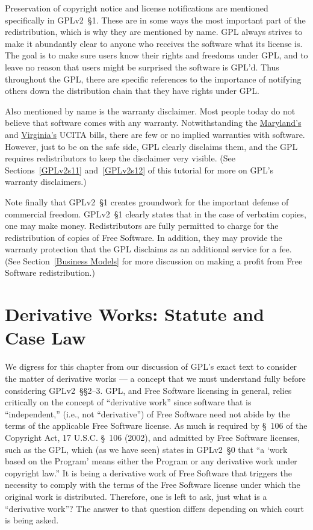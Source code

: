 Preservation of copyright notice and license notifications are mentioned
specifically in GPLv2~\S1.  These are in some ways the most important part of
the redistribution, which is why they are mentioned by name.  GPL
always strives to make it abundantly clear to anyone who receives the
software what its license is.  The goal is to make sure users know their
rights and freedoms under GPL, and to leave no reason that users might be
surprised the software is GPL'd. Thus
throughout the GPL, there are specific references to the importance of
notifying others down the distribution chain that they have rights under
GPL.

Also mentioned by name is the warranty disclaimer. Most people today do
not believe that software comes with any warranty.  Notwithstanding the
\href{http://mlis.state.md.us/2000rs/billfile/hb0019.htm}{Maryland's} and \href{http://leg1.state.va.us/cgi-bin/legp504.exe?001+ful+SB372ER}{Virginia's} UCITA bills, there are few or no implied warranties with software.
However, just to be on the safe side, GPL clearly disclaims them, and the
GPL requires redistributors to keep the disclaimer very visible. (See
Sections~\ref{GPLv2s11} and~\ref{GPLv2s12} of this tutorial for more on GPL's
warranty disclaimers.)

Note finally that GPLv2~\S1 creates groundwork for the important defense of
commercial freedom.  GPLv2~\S1 clearly states that in the case of verbatim
copies, one may make money.  Redistributors are fully permitted to charge
for the redistribution of copies of Free Software. In addition, they may
provide the warranty protection that the GPL disclaims as an additional
service for a fee. (See Section~\ref{Business Models} for more discussion
on making a profit from Free Software redistribution.)


\chapter{Derivative Works: Statute and Case Law}

We digress for this chapter from our discussion of GPL's exact text to
consider the matter of derivative works --- a concept that we must
understand fully before considering GPLv2~\S\S2--3\@. GPL, and Free
Software licensing in general, relies critically on the concept of
``derivative work'' since software that is ``independent,'' (i.e., not
``derivative'') of Free Software need not abide by the terms of the
applicable Free Software license. As much is required by \S~106 of the
Copyright Act, 17 U.S.C. \S~106 (2002), and admitted by Free Software
licenses, such as the GPL, which (as we have seen) states in GPLv2~\S0 that ``a
`work based on the Program' means either the Program or any derivative
work under copyright law.'' It is being a derivative work of Free Software
that triggers the necessity to comply with the terms of the Free Software
license under which the original work is distributed. Therefore, one is
left to ask, just what is a ``derivative work''? The answer to that
question differs depending on which court is being asked.


